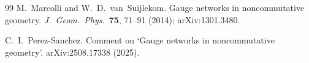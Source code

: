 \documentclass[11pt]{article}
\begin{document}
\begin{thebibliography}{99}
 M.~Marcolli and W.~D.~van~Suijlekom.
Gauge networks in noncommutative geometry.
\emph{J.~Geom.~Phys.}~\textbf{75}, 71--91 (2014); arXiv:1301.3480.

 C.~I.~Perez-Sanchez.
Comment on `Gauge networks in noncommutative geometry'.
arXiv:2508.17338 (2025).

\end{thebibliography}
\end{document}
